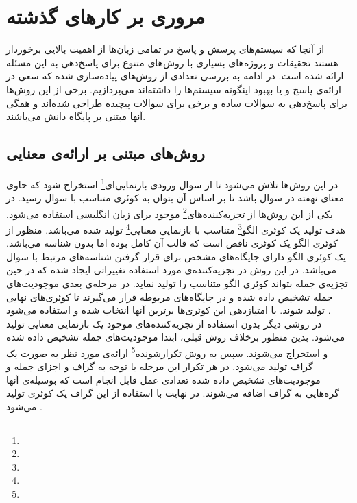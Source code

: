 \chapter{مروری بر کارهای گذشته}
از آنجا که سیستم‌های پرسش و پاسخ در تمامی زبان‌ها از اهمیت بالایی برخوردار هستند تحقیقات و پروژه‌های بسیاری با روش‌های متنوع برای پاسخ‌دهی به این مسئله ارائه شده است. در ادامه به بررسی تعدادی از روش‌های پیاده‌سازی شده که سعی در ارائه‌ی پاسخ و یا بهبود اینگونه سیستم‌ها را داشته‌اند می‌پردازیم. برخی از این روش‌ها برای پاسخ‌دهی به سوالات ساده و برخی برای سوالات پیچیده طراحی شده‌اند و همگی آنها مبتنی بر پایگاه دانش می‌باشند.

\section{روش‌های مبتنی بر ارائه‌ی معنایی}
در این روش‌ها تلاش می‌شود تا از سوال ورودی بازنمایی‌ای\footnote{} استخراج شود که حاوی معنای نهفته در سوال باشد تا بر اساس آن بتوان به کوئری متناسب با سوال رسید. در یکی از این روش‌ها از تجزیه‌کننده‌های\footnote{} موجود برای زبان انگلیسی استفاده می‌شود. هدف تولید یک کوئری الگو\footnote{} متناسب با بازنمایی معنایی\footnote{} تولید شده می‌باشد. منظور از کوئری الگو یک کوئری  ناقص است که قالب آن کامل بوده اما بدون شناسه می‌باشد. یک کوئری الگو دارای جایگاه‌های مشخص برای قرار گرفتن شناسه‌های مرتبط با سوال می‌باشد. در این روش در تجزیه‌کننده‌ی مورد استفاده تغییراتی ایجاد شده که در حین تجزیه‌ی جمله بتواند کوئری الگو متناسب را تولید نماید. در مرحله‌ی بعدی موجودیت‌های جمله تشخیص داده شده و در جایگاه‌های مربوطه قرار می‌گیرند تا کوئری‌های نهایی تولید شوند. با امتیازدهی این کوئری‌ها برترین آنها انتخاب شده و استفاده می‌شود \cite{unger2012tembased}.
\\در روشی دیگر بدون استفاده از تجزیه‌کننده‌های موجود یک بازنمایی معنایی تولید می‌شود. بدین منظور برخلاف روش قبلی، ابتدا موجودیت‌های جمله تشخیص داده شده و استخراج می‌شوند. سپس به روش تکرارشونده\footnote{} ارائه‌ی مورد نظر به صورت یک گراف تولید می‌شود. در هر تکرار این مرحله با توجه به گراف و اجزای جمله و موجودیت‌های تشخیص داده شده تعدادی عمل قابل انجام است که بوسیله‌ی آنها گره‌هایی به گراف اضافه می‌شوند. در نهایت با استفاده از این گراف یک کوئری تولید می‌شود \cite{sorokin2017endtoendweak}.
